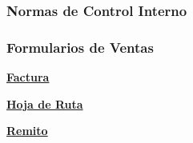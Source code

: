 \begin{description}
\end{description}

\subsubsection{Normas de Control Interno}

\pagebreak

\subsubsection{Formularios de Ventas}

\begin {description}
 \item \underline{\textbf{Factura}} \\
	 
 \item \underline{\textbf{Hoja de Ruta}} \\
	 
 \item \underline{\textbf{Remito}}  \\
	 
\end {description}



